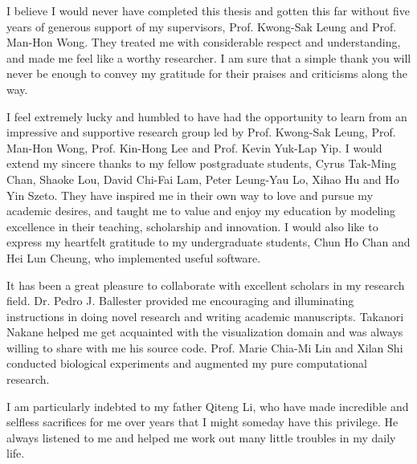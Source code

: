 I believe I would never have completed this thesis and gotten this far without five years of generous support of my supervisors, Prof. Kwong-Sak Leung and Prof. Man-Hon Wong. They treated me with considerable respect and understanding, and made me feel like a worthy researcher. I am sure that a simple thank you will never be enough to convey my gratitude for their praises and criticisms along the way.

I feel extremely lucky and humbled to have had the opportunity to learn from an impressive and supportive research group led by Prof. Kwong-Sak Leung, Prof. Man-Hon Wong, Prof. Kin-Hong Lee and Prof. Kevin Yuk-Lap Yip. I would extend my sincere thanks to my fellow postgraduate students, Cyrus Tak-Ming Chan, Shaoke Lou, David Chi-Fai Lam, Peter Leung-Yau Lo, Xihao Hu and Ho Yin Szeto. They have inspired me in their own way to love and pursue my academic desires, and taught me to value and enjoy my education by modeling excellence in their teaching, scholarship and innovation. I would also like to express my heartfelt gratitude to my undergraduate students, Chun Ho Chan and Hei Lun Cheung, who implemented useful software.

It has been a great pleasure to collaborate with excellent scholars in my research field. Dr. Pedro J. Ballester provided me encouraging and illuminating instructions in doing novel research and writing academic manuscripts. Takanori Nakane helped me get acquainted with the visualization domain and was always willing to share with me his source code. Prof. Marie Chia-Mi Lin and Xilan Shi conducted biological experiments and augmented my pure computational research.

I am particularly indebted to my father Qiteng Li, who have made incredible and selfless sacrifices for me over years that I might someday have this privilege. He always listened to me and helped me work out many little troubles in my daily life.
